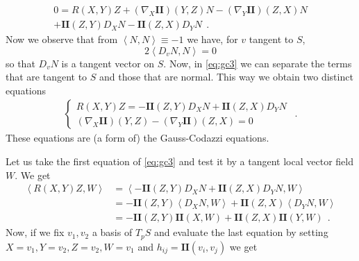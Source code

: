 \documentclass[a4paper,11pt,openright,twoside]{book}
\newcommand{\II}{\mathbf{I\!I}}
\newcommand{\1}{\mathds{1}}
\theoremstyle{plain}
\theoremstyle{definition}
\theoremstyle{remark}
\begin{document}
\begin{multline}\label{eq:gc3}
	0 = R(X,Y)Z + (\nabla_X \II)(Y,Z)N - (\nabla_Y\II) (Z,X)N\\ +\II(Z,Y)D_XN-\II(Z,X)D_YN
\ \ . 
\end{multline}
Now we observe that from  $\left<N,N \right> \equiv -1$ we have, for $v$ tangent to $S$, 
\[2\left<D_vN,N \right> = 0\] 
so that $D_vN$ is a tangent vector on $S$.
Now, in \eqref{eq:gc3} we can separate the terms that are tangent to $S$ and those that are normal. This way we obtain two distinct equations
\begin{align}\label{eq:gc4}
	\begin{cases}
		R(X,Y)Z  = -\II(Z,Y)D_XN+\II(Z,X)D_YN\\
		(\nabla_X \II)(Y,Z) - (\nabla_Y\II) (Z,X) = 0
	\end{cases}
\ \ . 
\end{align}
These equations are (a form of) the Gauss-Codazzi equations.

Let us take the first equation of \eqref{eq:gc3} and test it by a tangent local vector field $W$. We get
\begin{align*}
	\left<R(X,Y)Z,W \right> &=  \left<- \II(Z,Y)D_XN+\II(Z,X)D_YN, W\right>\\
							&= -\II(Z,Y)\left< D_XN, W\right> +\II(Z,X)\left<D_YN,W \right>\\
							&=-\II(Z,Y)\II(X,W) +\II(Z,X)\II(Y,W)
\ \ . 
\end{align*}
Now, if we fix $v_1,v_2$ a basis of $T_pS$ and evaluate the last equation by setting $X=v_1, Y=v_2, Z=v_2, W=v_1$ and $h_{ij}= \II(v_i, v_j)$ we get
\end{document}
